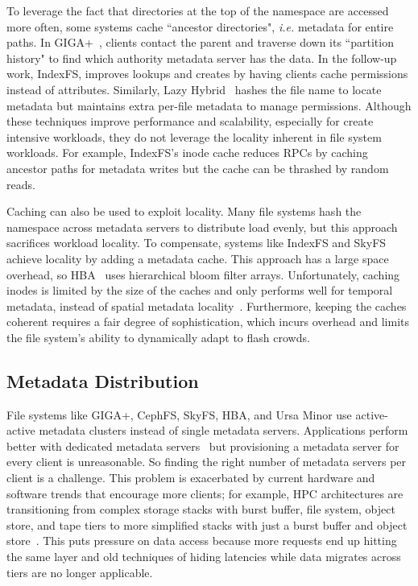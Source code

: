 To leverage the fact that directories at the top of the namespace are accessed
more often, some systems cache ``ancestor directories", {\it i.e.} metadata for
entire paths. In GIGA+~\cite{patil:fast2011-giga+}, clients contact the parent
and traverse down its ``partition history" to find which authority metadata
server has the data.  In the follow-up work, IndexFS, improves lookups and
creates by having clients cache permissions instead of attributes.  Similarly,
Lazy Hybrid~\cite{brandt:msst2003-lh} hashes the file name to locate metadata
but maintains extra per-file metadata to manage permissions.  Although these
techniques improve performance and scalability, especially for create intensive
workloads, they do not leverage the locality inherent in file system workloads.
For example, IndexFS's inode cache reduces RPCs by caching ancestor paths for
metadata writes but the cache can be thrashed by random reads.

Caching can also be used to exploit locality.  Many file systems hash the
namespace across metadata servers to distribute load evenly, but this approach
sacrifices workload locality. To compensate, systems like IndexFS and
SkyFS~\cite{xing:sc2009-skyfs} achieve locality by adding a metadata cache.
This approach has a large space overhead, so HBA~\cite{zhu:pds2008-hba} uses
hierarchical bloom filter arrays. Unfortunately, caching inodes is limited by
the size of the caches and only performs well for temporal metadata, instead of
spatial metadata locality~\cite{weil:sc2004-dyn-metadata, sevilla:sc15-mantle,
li:msst2006-dynamic}.  Furthermore, keeping the caches coherent requires a fair
degree of sophistication, which incurs overhead and limits the file system's
ability to dynamically adapt to flash crowds.

\subsection{Metadata Distribution}

File systems like GIGA+, CephFS, SkyFS, HBA, and Ursa Minor use active-active
metadata clusters instead of single metadata servers.  Applications perform
better with dedicated metadata servers~\cite{sevilla:sc15-mantle,
ren:sc2014-indexfs} but provisioning a metadata server for every client is
unreasonable. So finding the right number of metadata servers per client is a
challenge.  This problem is exacerbated by current hardware and software trends
that encourage more clients; for example, HPC architectures are transitioning
from complex storage stacks with burst buffer, file system, object store, and
tape tiers to more simplified stacks with just a burst buffer and object
store~\cite{bent:login16-hpc-trends}. This puts pressure on data access because
more requests end up hitting the same layer and old techniques of hiding
latencies while data migrates across tiers are no longer applicable.

